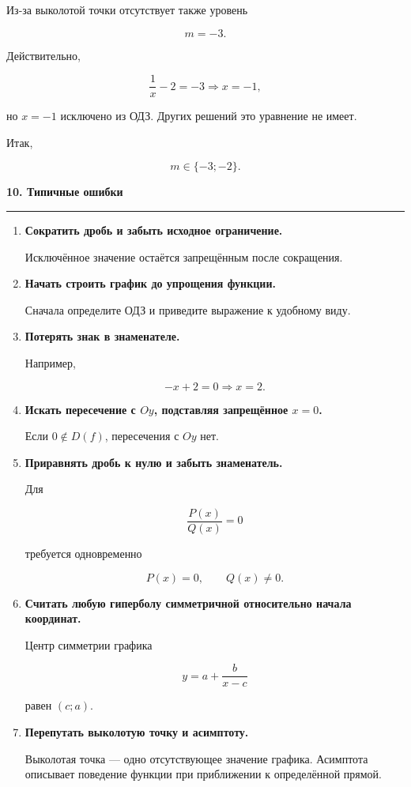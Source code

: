 \documentclass[a4paper,12pt]{article}
\newcommand{\sectiontitle}[1]{%
    \par\vspace{0.65em}
    {\Large\bfseries\color{darkaccent}#1}\par
    \vspace{0.15em}
    {\color{accent}\rule{\linewidth}{0.65pt}}\par
    \vspace{0.3em}
}
\begin{document}
Из-за выколотой точки отсутствует также уровень

\[
\boxed{m=-3}.
\]

Действительно,

\[
\frac1x-2=-3
\Longrightarrow
x=-1,
\]

но \(x=-1\) исключено из ОДЗ. Других решений это уравнение не имеет.

Итак,

\[
\boxed{m\in\{-3;-2\}}.
\]

\sectiontitle{10. Типичные ошибки}

\begin{enumerate}
    \item \textbf{Сократить дробь и забыть исходное ограничение.}

    Исключённое значение остаётся запрещённым после сокращения.

    \item \textbf{Начать строить график до упрощения функции.}

    Сначала определите ОДЗ и приведите выражение к удобному виду.

    \item \textbf{Потерять знак в знаменателе.}

    Например,

    \[
    -x+2=0
    \Longrightarrow
    x=2.
    \]

    \item \textbf{Искать пересечение с \(Oy\), подставляя запрещённое \(x=0\).}

    Если \(0\notin D(f)\), пересечения с \(Oy\) нет.

    \item \textbf{Приравнять дробь к нулю и забыть знаменатель.}

    Для

    \[
    \frac{P(x)}{Q(x)}=0
    \]

    требуется одновременно

    \[
    P(x)=0,
    \qquad
    Q(x)\ne0.
    \]

    \item \textbf{Считать любую гиперболу симметричной относительно начала координат.}

    Центр симметрии графика

    \[
    y=a+\frac{b}{x-c}
    \]

    равен \((c;a)\).

    \item \textbf{Перепутать выколотую точку и асимптоту.}

    Выколотая точка --- одно отсутствующее значение графика. Асимптота описывает
    поведение функции при приближении к определённой прямой.
\end{enumerate}
\end{document}
